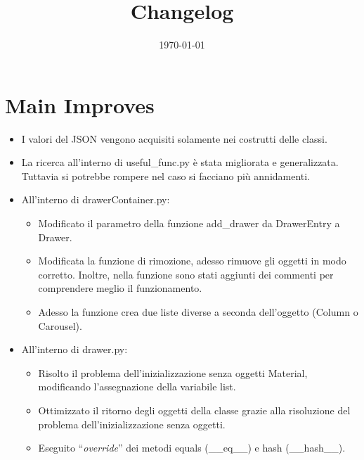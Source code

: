 \documentclass[a4paper]{article}
\newcommand{\dquotes}[1]{``#1''}
\begin{document}
	\title{Changelog}
	\date{\today}
	\maketitle
	
	\newpage
	
	\section*{Main Improves}
	
	\begin{itemize}[label=]
		\item I valori del \textsf{JSON} vengono acquisiti solamente nei costrutti delle classi.
		
		\item La ricerca all'interno di \textsf{useful\_func.py} è stata migliorata e generalizzata. Tuttavia si potrebbe rompere nel caso si facciano più annidamenti.
		
		\item All'interno di \textsf{drawerContainer.py}:
			\begin{itemize}
				\item Modificato il parametro della funzione add\_drawer da \textsf{DrawerEntry} a \textsf{Drawer}.
				
				\item Modificata la funzione di rimozione, adesso rimuove gli oggetti in modo corretto. Inoltre, nella funzione sono stati aggiunti dei commenti per comprendere meglio il funzionamento.
				
				\item Adesso la funzione crea due liste diverse a seconda dell'oggetto (\textsf{Column} o \textsf{Carousel}).
			\end{itemize}
		
		\item All'interno di \textsf{drawer.py}:
			\begin{itemize}
				\item Risolto il problema dell'inizializzazione senza oggetti \textsf{Material}, modificando l'assegnazione della variabile \textsf{list}.
				
				\item Ottimizzato il ritorno degli oggetti della classe grazie alla risoluzione del problema dell'inizializzazione senza oggetti.
				
				\item Eseguito \dquotes{\emph{override}} dei metodi \textsf{equals (\_\_eq\_\_)} e \textsf{hash (\_\_hash\_\_)}.
			\end{itemize}
		

\end{itemize}
\end{document}
